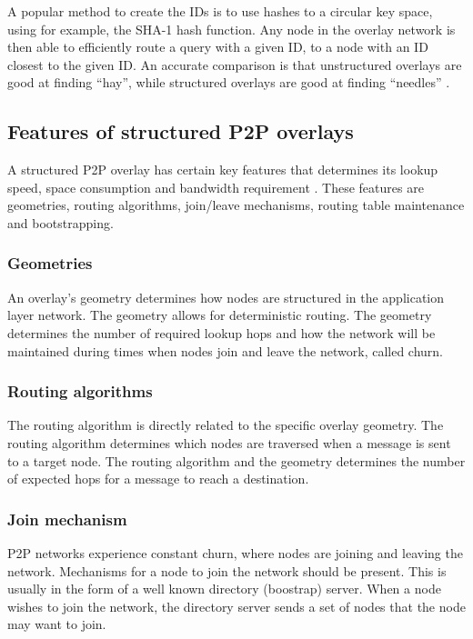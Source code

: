 A popular method to create the IDs is to use hashes to a circular key space, using for example, the SHA-1 hash function. Any node in the overlay network is then able to efficiently route a query with a given ID, to a node with an ID closest to the given ID. An accurate comparison is that unstructured overlays are good at finding ``hay'', while structured overlays are good at finding ``needles'' \cite{Rodrigues_acm_comms_p2p}.

\subsection{Features of structured P2P overlays}

A structured P2P overlay has certain key features that determines its lookup speed, space consumption and bandwidth requirement \cite{p2p_networking_handbook}. These features are geometries, routing algorithms, join/leave mechanisms, routing table maintenance and bootstrapping.

\subsubsection{Geometries}

An overlay's geometry determines how nodes are structured in the application layer network. The geometry allows for deterministic routing. The geometry determines the number of required lookup hops and how the network will be maintained during times when nodes join and leave the network, called churn.

\subsubsection{Routing algorithms}

The routing algorithm is directly related to the specific overlay geometry. The routing algorithm determines which nodes are traversed when a message is sent to a target node. The routing algorithm and the geometry determines the number of expected hops for a message to reach a destination.

\subsubsection{Join mechanism}

P2P networks experience constant churn, where nodes are joining and leaving the network. Mechanisms for a node to join the network should be present. This is usually in the form of a well known directory (boostrap) server. When a node wishes to join the network, the directory server sends a set of nodes that the node may want to join.


